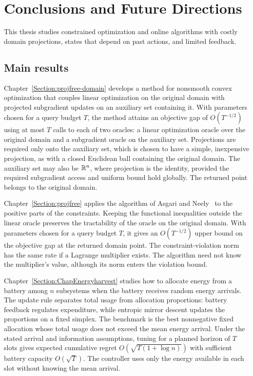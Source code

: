 \chapter{Conclusions and Future Directions}
\label{Section:Conclusion}

This thesis studies constrained optimization and online algorithms with
costly domain projections, states that depend on past actions, and limited
feedback.

\section{Main results}

Chapter~\ref{Section:projfree-domain} develops a method for nonsmooth convex
optimization that couples linear optimization on the original domain with
projected subgradient updates on an auxiliary set containing it.
With parameters chosen for a query budget $T$, the method attains an
objective gap of $O(T^{-1/2})$ using at most $T$ calls to each of two
oracles: a linear optimization oracle over the original domain and a
subgradient oracle on the auxiliary set. Projections are required only
onto the auxiliary set, which is chosen to have a simple, inexpensive
projection, as with a closed Euclidean ball containing the original domain.
The auxiliary set may also be $\mathbb{R}^n$, where projection is the identity,
provided the required subgradient access and uniform bound hold globally.
The returned point belongs to the original domain.

Chapter~\ref{Section:projfree} applies the algorithm of Asgari and
Neely~\cite{asgari2024nonsmooth} to the positive parts of the constraints.
Keeping the functional inequalities outside the linear oracle preserves
the tractability of the oracle on the original domain.
With parameters chosen for a query budget $T$, it gives an $O(T^{-1/2})$
upper bound on the objective gap at the returned domain point.
The constraint-violation norm has the same rate if a Lagrange
multiplier exists. The algorithm need not know the multiplier's value,
although its norm enters the violation bound.

Chapter~\ref{Section:ChapEnergyharvest} studies how to allocate energy from a
battery among $n$ subsystems when the battery receives random energy arrivals.
The update rule separates total usage from allocation
proportions: battery feedback regulates expenditure, while entropic mirror
descent updates the proportions on a fixed simplex.
The benchmark is the best nonnegative fixed allocation
whose total usage does not exceed the mean energy arrival.
Under the stated arrival and information assumptions, tuning for a planned
horizon of $T$ slots gives expected cumulative regret
$O(\sqrt{T(1+\log n)})$ with sufficient battery capacity $O(\sqrt T)$.
The controller uses only the energy available in each slot without knowing
the mean arrival.

